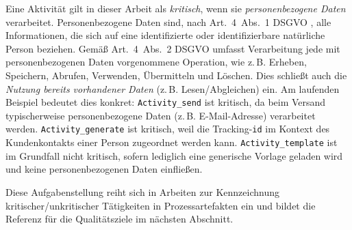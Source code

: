 Eine Aktivität gilt in dieser Arbeit als \emph{kritisch}, wenn sie \emph{personenbezogene Daten} verarbeitet. Personenbezogene Daten sind, nach Art.~4~Abs.~1 \ac{DSGVO} \cite{GDPR2016}, alle Informationen, die sich auf eine identifizierte oder identifizierbare natürliche Person beziehen. Gemäß Art.~4~Abs.~2 \ac{DSGVO} \cite{GDPR2016} umfasst Verarbeitung jede mit personenbezogenen Daten vorgenommene Operation, wie z.\,B. Erheben, Speichern, Abrufen, Verwenden, Übermitteln und Löschen. Dies schließt auch die \emph{Nutzung bereits vorhandener Daten} (z.\,B. Lesen/Abgleichen) ein. Am laufenden Beispiel bedeutet dies konkret: \texttt{Activity\_send} ist kritisch, da beim Versand typischerweise personenbezogene Daten (z.\,B. E-Mail-Adresse) verarbeitet werden. \texttt{Activity\_generate} ist kritisch, weil die Tracking-\texttt{id} im Kontext des Kundenkontakts einer Person zugeordnet werden kann. \texttt{Activity\_template} ist im Grundfall nicht kritisch, sofern lediglich eine generische Vorlage geladen wird und keine personenbezogenen Daten einfließen.

Diese Aufgabenstellung reiht sich in Arbeiten zur Kennzeichnung kritischer/unkritischer Tätigkeiten in Prozessartefakten ein und bildet die Referenz für die Qualitätsziele im nächsten Abschnitt. \cite{nake2023towards}